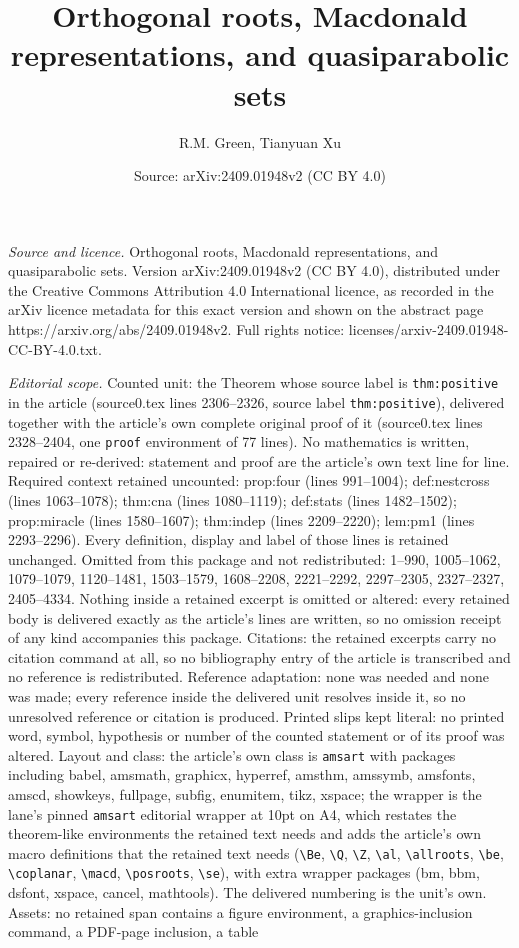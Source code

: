 \documentclass[10pt,a4paper]{amsart}
\title[Orthogonal roots, Macdonald representations, and quasiparabo]{Orthogonal roots, Macdonald representations, and quasiparabolic sets}
\author{R.M. Green, Tianyuan Xu}
\date{Source: arXiv:2409.01948v2 (CC BY 4.0)}
\begin{document}
\maketitle

\noindent\emph{Source and licence.} Orthogonal roots, Macdonald representations, and quasiparabolic sets. Version arXiv:2409.01948v2 (CC BY 4.0), distributed under the Creative Commons Attribution 4.0 International licence, as recorded in the arXiv licence metadata for this exact version and shown on the abstract page https://arxiv.org/abs/2409.01948v2. Full rights notice: licenses/arxiv-2409.01948-CC-BY-4.0.txt.\par\smallskip

\noindent\textit{Editorial scope.} Counted unit: the Theorem whose source label is \texttt{thm:positive} in the article (source0.tex lines 2306--2326, source label \texttt{thm:positive}), delivered together with the article's own complete original proof of it (source0.tex lines 2328--2404, one \texttt{proof} environment of 77 lines). No mathematics is written, repaired or re-derived: statement and proof are the article's own text line for line. Required context retained uncounted: prop:four (lines 991--1004); def:nestcross (lines 1063--1078); thm:cna (lines 1080--1119); def:stats (lines 1482--1502); prop:miracle (lines 1580--1607); thm:indep (lines 2209--2220); lem:pm1 (lines 2293--2296). Every definition, display and label of those lines is retained unchanged. Omitted from this package and not redistributed: 1--990, 1005--1062, 1079--1079, 1120--1481, 1503--1579, 1608--2208, 2221--2292, 2297--2305, 2327--2327, 2405--4334. Nothing inside a retained excerpt is omitted or altered: every retained body is delivered exactly as the article's lines are written, so no omission receipt of any kind accompanies this package. Citations: the retained excerpts carry no citation command at all, so no bibliography entry of the article is transcribed and no reference is redistributed. Reference adaptation: none was needed and none was made; every reference inside the delivered unit resolves inside it, so no unresolved reference or citation is produced. Printed slips kept literal: no printed word, symbol, hypothesis or number of the counted statement or of its proof was altered. Layout and class: the article's own class is \texttt{amsart} with packages including babel, amsmath, graphicx, hyperref, amsthm, amssymb, amsfonts, amscd, showkeys, fullpage, subfig, enumitem, tikz, xspace; the wrapper is the lane's pinned \texttt{amsart} editorial wrapper at 10pt on A4, which restates the theorem-like environments the retained text needs and adds the article's own macro definitions that the retained text needs (\texttt{\textbackslash Be}, \texttt{\textbackslash Q}, \texttt{\textbackslash Z}, \texttt{\textbackslash al}, \texttt{\textbackslash allroots}, \texttt{\textbackslash be}, \texttt{\textbackslash coplanar}, \texttt{\textbackslash macd}, \texttt{\textbackslash posroots}, \texttt{\textbackslash se}), with extra wrapper packages (bm, bbm, dsfont, xspace, cancel, mathtools). The delivered numbering is the unit's own. Assets: no retained span contains a figure environment, a graphics-inclusion command, a PDF-page inclusion, a table 
\end{document}
